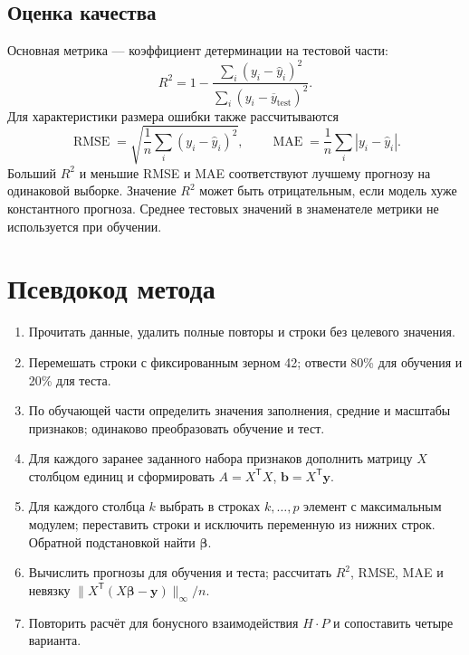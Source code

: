\subsection{Оценка качества}

Основная метрика --- коэффициент детерминации на тестовой части:
\begin{equation}
R^2=1-\frac{\sum_i(y_i-\widehat y_i)^2}
{\sum_i(y_i-\overline y_{\mathrm{test}})^2}.
\end{equation}
Для характеристики размера ошибки также рассчитываются
\begin{equation}
\operatorname{RMSE}=\sqrt{\frac{1}{n}\sum_i(y_i-\widehat y_i)^2},
\qquad
\operatorname{MAE}=\frac{1}{n}\sum_i|y_i-\widehat y_i|.
\end{equation}
Больший $R^2$ и меньшие RMSE и MAE соответствуют лучшему прогнозу на
одинаковой выборке. Значение $R^2$ может быть отрицательным, если модель
хуже константного прогноза. Среднее тестовых значений в знаменателе
метрики не используется при обучении.

\section{Псевдокод метода}

\begin{enumerate}
\item Прочитать данные, удалить полные повторы и строки без целевого значения.
\item Перемешать строки с фиксированным зерном 42; отвести 80\% для обучения
и 20\% для теста.
\item По обучающей части определить значения заполнения, средние и масштабы
признаков; одинаково преобразовать обучение и тест.
\item Для каждого заранее заданного набора признаков дополнить матрицу $X$
столбцом единиц и сформировать $A=X^{\mathsf T}X$,
$\boldsymbol b=X^{\mathsf T}\boldsymbol y$.
\item Для каждого столбца $k$ выбрать в строках $k,\ldots,p$ элемент с
максимальным модулем; переставить строки и исключить переменную из нижних
строк. Обратной подстановкой найти $\boldsymbol\beta$.
\item Вычислить прогнозы для обучения и теста; рассчитать $R^2$, RMSE, MAE
и невязку $\|X^{\mathsf T}(X\boldsymbol\beta-\boldsymbol y)\|_\infty/n$.
\item Повторить расчёт для бонусного взаимодействия $H\cdot P$ и сопоставить
четыре варианта.
\end{enumerate}

